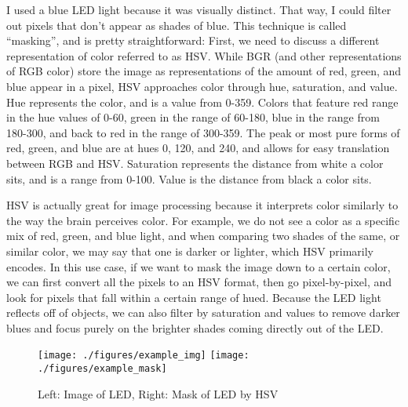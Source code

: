 \documentclass[
    12pt,
    twoside,
    bibstyle=chicago,
    headerstyle=uppercase,
	bibfile=biblatex_updating.bib
]{reedthesis}
\begin{document}
I used a blue LED light because it was visually distinct. That way, I could filter out pixels that don't appear as shades of blue. This technique is called “masking”, and is pretty straightforward: First, we need to discuss a different representation of color referred to as HSV. While BGR (and other representations of RGB color) store the image as representations of the amount of red, green, and blue appear in a pixel, HSV approaches color through hue, saturation, and value. Hue represents the color, and is a value from 0-359. Colors that feature red range in the hue values of 0-60, green in the range of 60-180, blue in the range from 180-300, and back to red in the range of 300-359. The peak or most pure forms of red, green, and blue are at hues 0, 120, and 240, and allows for easy translation between RGB and HSV. Saturation represents the distance from white a color sits, and is a range from 0-100. Value is the distance from black a color sits.

HSV is actually great for image processing because it interprets color similarly to the way the brain perceives color. For example, we do not see a color as a specific mix of red, green, and blue light, and when comparing two shades of the same, or similar color, we may say that one is darker or lighter, which HSV primarily encodes. In this use case, if we want to mask the image down to a certain color, we can first convert all the pixels to an HSV format, then go pixel-by-pixel, and look for pixels that fall within a certain range of hued. Because the LED light reflects off of objects, we can also filter by saturation and values to remove darker blues and focus purely on the brighter shades coming directly out of the LED.

\begin{figure}[h]
	   
	       \centering
	    
	    \texttt{[image: ./figures/example\_img]} 
		\hfill	    
	    \texttt{[image: ./figures/example\_mask]}
	     \caption{Left: Image of LED, Right: Mask of LED by HSV}
	 \label{LED Masking Example}
	\end{figure}
\end{document}
